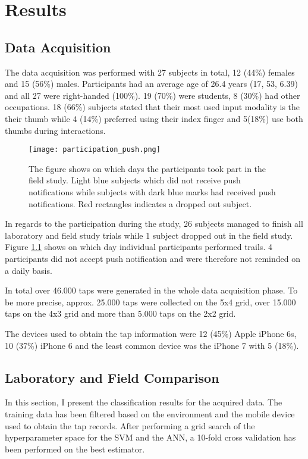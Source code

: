 \chapter{Results\label{cha:chapter6}}
\section{Data Acquisition}
The data acquisition was performed with 27 subjects in total, 12 (44\%) females and 15 (56\%) males. Participants had an average age of 26.4 years (17, 53, 6.39) and all 27 were right-handed (100\%). 19 (70\%) were students, 8 (30\%) had other occupations.
18 (66\%) subjects stated that their most used input modality is the their thumb while 4 (14\%) preferred using their index finger and 5(18\%) use both thumbs during interactions.\\

\begin{figure}[h!]
  \centering
  \texttt{[image: participation\_push.png]}
  \caption{The figure shows on which days the participants took part in the field study. Light blue subjects which did not receive push notifications while subjects with dark blue marks had received push notifications. Red rectangles indicates a dropped out subject.} \label{fig:participation}
\end{figure}

In regards to the participation during the study, 26 subjects managed to finish all laboratory and field study trials while 1 subject dropped out in the field study. Figure \ref{fig:participation} shows on which day individual participants performed trails. 4 participants did not accept push notification and were therefore not reminded on a daily basis.

In total over 46.000 taps were generated in the whole data acquisition phase. To be more precise, approx. 25.000 taps were collected on the 5x4 grid, over 15.000 taps on the 4x3 grid and more than 5.000 taps on the 2x2 grid.

The devices used to obtain the tap information were 12 (45\%) Apple iPhone 6s, 10 (37\%) iPhone 6 and the least common device was the iPhone 7 with 5 (18\%).

\section{Laboratory and Field Comparison}
In this section, I present the classification results for the acquired data. The training data has been filtered based on the environment and the mobile device used to obtain the tap records. After performing a grid search of the hyperparameter space for the SVM and the ANN, a 10-fold cross validation has been performed on the best estimator.


